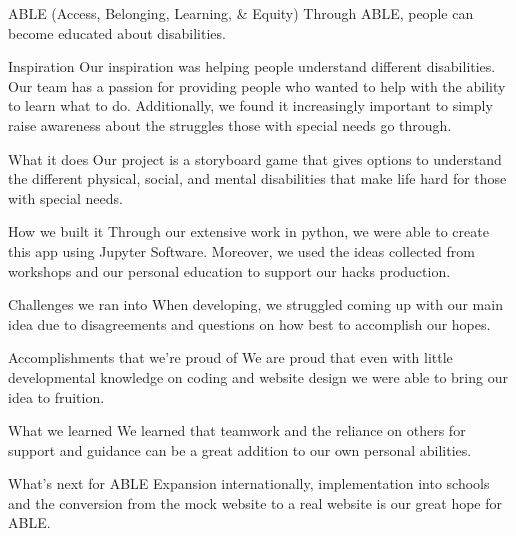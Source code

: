 ABLE (Access, Belonging, Learning, & Equity)
Through ABLE, people can become educated about disabilities.

Inspiration
Our inspiration was helping people understand different disabilities. Our team has a passion for providing people who wanted to help with the ability to learn what to do. Additionally, we found it increasingly important to simply raise awareness about the struggles those with special needs go through.

What it does
Our project is a storyboard game that gives options to understand the different physical, social, and mental disabilities that make life hard for those with special needs.

How we built it
Through our extensive work in python, we were able to create this app using Jupyter Software. Moreover, we used the ideas collected from workshops and our personal education to support our hacks production.

Challenges we ran into
When developing, we struggled coming up with our main idea due to disagreements and questions on how best to accomplish our hopes.

Accomplishments that we're proud of
We are proud that even with little developmental knowledge on coding and website design we were able to bring our idea to fruition.

What we learned
We learned that teamwork and the reliance on others for support and guidance can be a great addition to our own personal abilities.

What's next for ABLE
Expansion internationally, implementation into schools and the conversion from the mock website to a real website is our great hope for ABLE.
